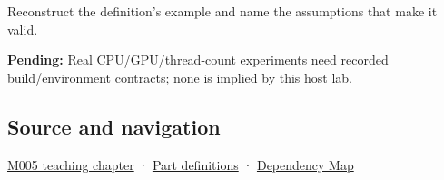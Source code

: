 Reconstruct the definition's example and name the assumptions that make it valid.

\textbf{Pending:} Real CPU/GPU/thread-count experiments need recorded build/environment contracts; none is implied by this host lab.

\subsection{Source and navigation}\label{appendix-5f1a2c3f97ff-source-and-navigation}

\hyperref[01-foundations-i-ch001-when-arithmetic-meets-uncertainty]{M005 teaching chapter} · \hyperref[appendix-fd090d982a15-m005---parts-77-88]{Part definitions} · \hyperref[appendix-4ad47bdd269a]{Dependency Map}
